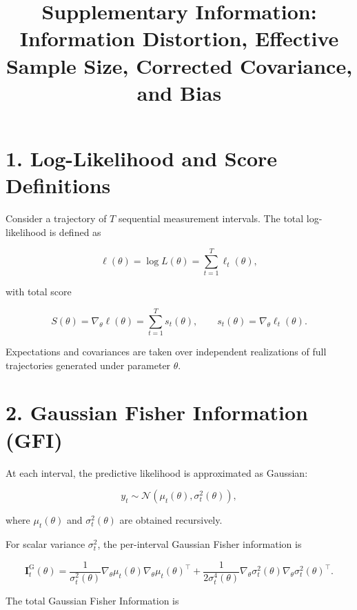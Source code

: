 \documentclass[11pt]{article}
\title{Supplementary Information: Information Distortion, Effective Sample Size, Corrected Covariance, and Bias}
\author{}
\date{}
\begin{document}
\maketitle

\section*{1. Log-Likelihood and Score Definitions}

Consider a trajectory of $T$ sequential measurement intervals.
The total log-likelihood is defined as

\begin{equation}
\ell(\theta) = \log L(\theta) = \sum_{t=1}^T \ell_t(\theta),
\end{equation}

with total score

\begin{equation}
S(\theta) = \nabla_\theta \ell(\theta)
= \sum_{t=1}^T s_t(\theta),
\qquad
s_t(\theta) = \nabla_\theta \ell_t(\theta).
\end{equation}

Expectations and covariances are taken over independent realizations of full trajectories generated under parameter $\theta$.

\section*{2. Gaussian Fisher Information (GFI)}

At each interval, the predictive likelihood is approximated as Gaussian:

\begin{equation}
y_t \sim \mathcal{N}\!\left(\mu_t(\theta), \sigma_t^2(\theta)\right),
\end{equation}

where $\mu_t(\theta)$ and $\sigma_t^2(\theta)$ are obtained recursively.

For scalar variance $\sigma_t^2$, the per-interval Gaussian Fisher information is

\begin{equation}
\mathbf I_t^{\mathrm{G}}(\theta)
=
\frac{1}{\sigma_t^2(\theta)} 
\nabla_\theta \mu_t(\theta)
\nabla_\theta \mu_t(\theta)^\top
+
\frac{1}{2\sigma_t^4(\theta)} 
\nabla_\theta \sigma_t^2(\theta)
\nabla_\theta \sigma_t^2(\theta)^\top.
\end{equation}

The total Gaussian Fisher Information is
\end{document}
